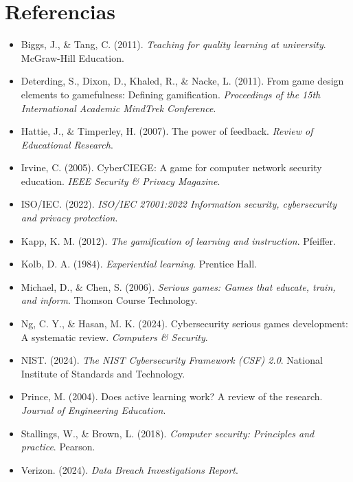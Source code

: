 \section{Referencias}

\begin{itemize}
    \item Biggs, J., \& Tang, C. (2011). \textit{Teaching for quality learning at university}. McGraw-Hill Education.
    \item Deterding, S., Dixon, D., Khaled, R., \& Nacke, L. (2011). From game design elements to gamefulness: Defining gamification. \textit{Proceedings of the 15th International Academic MindTrek Conference}.
    \item Hattie, J., \& Timperley, H. (2007). The power of feedback. \textit{Review of Educational Research}.
    \item Irvine, C. (2005). CyberCIEGE: A game for computer network security education. \textit{IEEE Security \& Privacy Magazine}.
    \item ISO/IEC. (2022). \textit{ISO/IEC 27001:2022 Information security, cybersecurity and privacy protection}.
    \item Kapp, K. M. (2012). \textit{The gamification of learning and instruction}. Pfeiffer.
    \item Kolb, D. A. (1984). \textit{Experiential learning}. Prentice Hall.
    \item Michael, D., \& Chen, S. (2006). \textit{Serious games: Games that educate, train, and inform}. Thomson Course Technology.
    \item Ng, C. Y., \& Hasan, M. K. (2024). Cybersecurity serious games development: A systematic review. \textit{Computers \& Security}.
    \item NIST. (2024). \textit{The NIST Cybersecurity Framework (CSF) 2.0}. National Institute of Standards and Technology.
    \item Prince, M. (2004). Does active learning work? A review of the research. \textit{Journal of Engineering Education}.
    \item Stallings, W., \& Brown, L. (2018). \textit{Computer security: Principles and practice}. Pearson.
    \item Verizon. (2024). \textit{Data Breach Investigations Report}.
\end{itemize}
